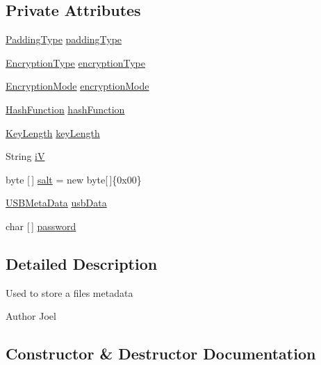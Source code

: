 \subsection*{Private Attributes}
\begin{DoxyCompactItemize}
\item 
\mbox{\hyperlink{enumenums_1_1_padding_type}{Padding\+Type}} \mbox{\hyperlink{classpersistence_1_1_meta_data_a68266f3ba604835eb47717b246197a3a}{padding\+Type}}
\item 
\mbox{\hyperlink{enumenums_1_1_encryption_type}{Encryption\+Type}} \mbox{\hyperlink{classpersistence_1_1_meta_data_a09c1b0443d6c5ee3fe58b77fbaf3f1f8}{encryption\+Type}}
\item 
\mbox{\hyperlink{enumenums_1_1_encryption_mode}{Encryption\+Mode}} \mbox{\hyperlink{classpersistence_1_1_meta_data_a9f43ee5f622a5634c751d027ab64287e}{encryption\+Mode}}
\item 
\mbox{\hyperlink{enumenums_1_1_hash_function}{Hash\+Function}} \mbox{\hyperlink{classpersistence_1_1_meta_data_abefaf99931c3284bf4d069ff253ec714}{hash\+Function}}
\item 
\mbox{\hyperlink{enumenums_1_1_key_length}{Key\+Length}} \mbox{\hyperlink{classpersistence_1_1_meta_data_ae6b0f8f276c22bca3d79628131e2b274}{key\+Length}}
\item 
String \mbox{\hyperlink{classpersistence_1_1_meta_data_a5c426ff8fb562b6e8e045fe0da09d315}{iV}}
\item 
byte \mbox{[}$\,$\mbox{]} \mbox{\hyperlink{classpersistence_1_1_meta_data_af5566fbfbb66a3605578bb3524a701a4}{salt}} = new byte\mbox{[}$\,$\mbox{]}\{0x00\}
\item 
\mbox{\hyperlink{classpersistence_1_1_u_s_b_meta_data}{U\+S\+B\+Meta\+Data}} \mbox{\hyperlink{classpersistence_1_1_meta_data_a703608d838972ff752e7e78f8cb0cbe2}{usb\+Data}}
\item 
char \mbox{[}$\,$\mbox{]} \mbox{\hyperlink{classpersistence_1_1_meta_data_a4580678ad37f2d5dcd6bc80761a97bad}{password}}
\end{DoxyCompactItemize}


\subsection{Detailed Description}
Used to store a files metadata \begin{DoxyAuthor}{Author}
Joel 
\end{DoxyAuthor}


\subsection{Constructor \& Destructor Documentation}
\mbox{\label{classpersistence_1_1_meta_data_a9a1db720156f7a2bf7a556c4c95d2619}} 
